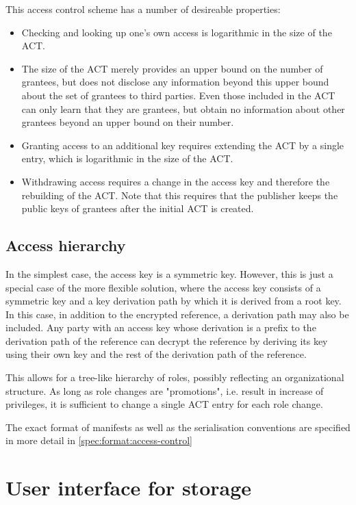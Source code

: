 This access control scheme has a number of desireable properties:
\begin{itemize}
\item Checking and looking up one's own access is logarithmic in the size of the ACT.
\item The size of the ACT merely provides an upper bound on the number of grantees, but does not disclose any information beyond this upper bound about the set of grantees to third parties. Even those included in the ACT can only learn that they are grantees, but obtain no information about other grantees beyond an upper bound on their number.
\item Granting access to an additional key requires extending the ACT by a single entry, which is logarithmic in the size of the ACT. 
\item Withdrawing access requires a change in the access key and therefore the rebuilding of the ACT. Note that this requires that the publisher keeps the public keys of grantees after the initial ACT is created.
\end{itemize}

\subsection{Access hierarchy}

In the simplest case, the access key is a symmetric key. However, this is just a special case of the more flexible solution, where
the access key consists of a symmetric key and a key derivation path by which it is derived from a root key. In this case, in addition to the encrypted reference, a derivation path may also be included. Any party with an access key whose derivation is a prefix to the derivation path of the reference can decrypt the reference by deriving its key using their own key and the rest of the derivation path of the reference.

This allows for a tree-like hierarchy of roles, possibly reflecting an organizational structure. As long as role changes are "promotions", i.e. result in increase of privileges, it is sufficient to change a single ACT entry for each role change.

The exact format of manifests as well as the serialisation conventions are specified in more detail in \ref{spec:format:access-control}

\section{User interface for storage}\label{sec:storage-ux}

